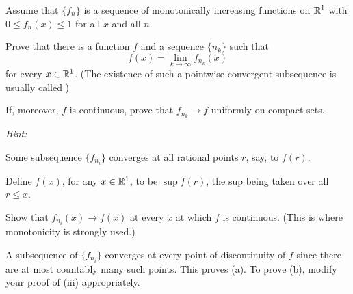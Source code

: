 \begin{myExercise}
    \label{ex:7.13}
    Assume that $\{f_n\}$ is a sequence of monotonically increasing functions on ${\protect\mathbb R}^1$ with $0 \leq f_n(x) \leq 1$ for all $x$ and all $n$.
    \begin{asparaenum}[(a)]
        \item Prove that there is a function $f$ and a sequence $\{n_k\}$ such that 
        \begin{equation*}
            f(x) = \lim_{k \to \infty} f_{n_k}(x)
        \end{equation*}
        for every $x \in {\protect\mathbb R}^1$.
        (The existence of such a pointwise convergent subsequence is usually called )
        \item If, moreover, $f$ is continuous, prove that $f_{n_k} \rightarrow f$ uniformly on compact sets.
    \end{asparaenum}

    \emph{Hint:} \begin{inparaenum}[(i)]
        \item Some subsequence $\{f_{n_i}\}$ converges at all rational points $r$, say, to $f(r)$. 
        \item Define $f(x)$, for any $x \in {\protect\mathbb R}^1$, to be $\sup f(r)$, the sup being taken over all $r \leq x$.
        \item Show that $f_{n_i}(x) \rightarrow f(x)$ at every $x$ at which $f$ is continuous. (This is where monotonicity is strongly used.) 
        \item A subsequence of $\{f_{n_i}\}$ converges at every point of discontinuity of $f$ since there are at most countably many such points. This proves (a). To prove (b), modify your proof of (iii) appropriately.
    \end{inparaenum}
\end{myExercise}


